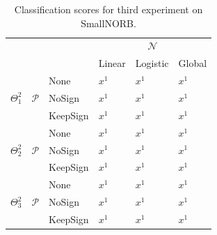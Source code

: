 \documentclass[12pt,a4paper,oneside,english]{UPBThesis}
\begin{document}
\renewcommand{\arraystretch}{1.2}
\begin{table}
  \caption{Classification scores for third experiment on SmallNORB.}
  \label{table:RecoderEvNORBSmallSmallResultsNP}
  \begin{tabularx}{\textwidth}{ccR|RRR|}
    & & &  \tabularnewline
    & & & Linear & Logistic & Global \tabularnewline\hline
     &  & None & $x^1$ & $x^1$ & $x^1$ \tabularnewline
     &  & NoSign & $x^1$ & $x^1$ & $x^1$ \tabularnewline
     &  & KeepSign & $x^1$ & $x^1$ & $x^1$ \tabularnewline\hline\hline
     &  & None & $x^1$ & $x^1$ & $x^1$ \tabularnewline
     &  & NoSign & $x^1$ & $x^1$ & $x^1$ \tabularnewline
     &  & KeepSign & $x^1$ & $x^1$ & $x^1$ \tabularnewline\hline\hline
     &  & None & $x^1$ & $x^1$ & $x^1$ \tabularnewline
     &  & NoSign & $x^1$ & $x^1$ & $x^1$ \tabularnewline
     &  & KeepSign & $x^1$ & $x^1$ & $x^1$ \tabularnewline\hline
  \end{tabularx}
\end{table}
\renewcommand{\arraystretch}{1.0}
\end{document}
